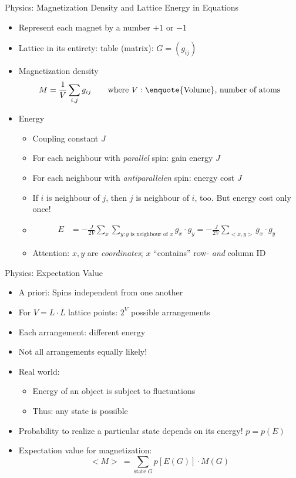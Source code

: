 \begin{frame}{Physics: Magnetization Density and Lattice Energy in Equations}
%
\begin{itemize}
\item Represent each magnet by a number $+1$ or $-1$
\item Lattice in its entirety: table (matrix): $G = \left( g_{ij} \right)$
\item Magnetization density
	\[ M = \frac{1}{V} \sum_{i, j} g_{ij} \qquad \text{where } V: \text{\enquote{Volume}, number of atoms} \]
\item Energy
	\begin{itemize}
	\item Coupling constant $J$
	\item For each neighbour with \emph{parallel} spin: gain energy $J$
	\item For each neighbour with \emph{antiparallelen} spin: energy cost $J$
	\item If $i$ is neighbour of $j$, then $j$ is neighbour of $i$, too. But energy cost only once!
	\item 
		\begin{align*}
			E &= -\frac{J}{2V} \sum_x \sum_{y: y \text{ is neighbour of }x} g_x \cdot g_y 
			  = -\frac{J}{2V} \sum_{<x, y>} g_x \cdot g_y
		\end{align*}			
	\item Attention: $x, y$ are \emph{coordinates}; $x$ \enquote{contains} row- \emph{and} column ID
	\end{itemize}
\end{itemize}
%
\end{frame}


\begin{frame}{Physics: Expectation Value}
%
\begin{itemize}
\item A priori: Spins independent from one another
\item For $V = L \cdot L$ lattice points: $2^V$ possible arrangements
\item Each arrangement: different energy
\item Not all arrangements equally likely!
\item Real world:
	\begin{itemize}
	\item Energy of an object is subject to fluctuations
	\item Thus: any state is possible
	\end{itemize}
\item Probability to realize a particular state depends on its energy! $p = p(E)$
\item Expectation value for magnetization:
	\[ <M> ~ = \sum_{\text{state } G} p[E(G)] \cdot M(G) \]
\end{itemize}
%
\end{frame}

